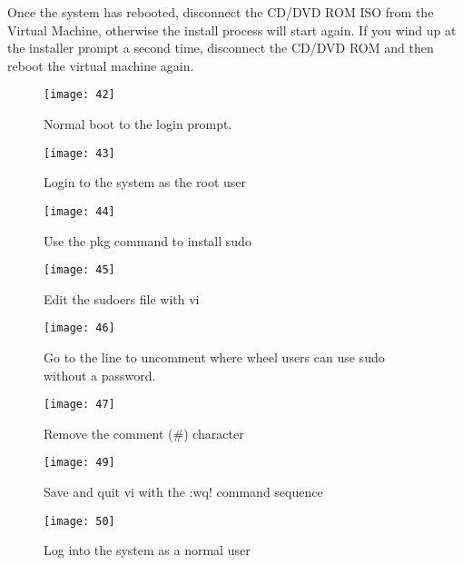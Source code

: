 Once the system has rebooted, disconnect the CD/DVD ROM ISO from the
Virtual Machine, otherwise the install process will start again.  If
you wind up at the installer prompt a second time, disconnect the
CD/DVD ROM and then reboot the virtual machine again.

\begin{figure}
  \centering
\texttt{[image: 42]}
  \caption{Normal boot to the login prompt.}
  \label{fig:utm-fbsd-login}
\end{figure}

\begin{figure}
  \centering
\texttt{[image: 43]}
  \caption{Login to the system as the root user}
  \label{fig:utm-fbsd-root}
\end{figure}

\begin{figure}
  \centering
\texttt{[image: 44]}
  \caption{Use the pkg command to install sudo}
  \label{fig:utm-fbsd-pkg}
\end{figure}

\begin{figure}
  \centering
\texttt{[image: 45]}
  \caption{Edit the sudoers file with vi}
  \label{fig:utm-fbsd-sudoers}
\end{figure}

\begin{figure}
  \centering
\texttt{[image: 46]}
  \caption{Go to the line to uncomment where wheel users can use sudo
    without a password.}
  \label{fig:utm-fbsd-wheel}
\end{figure}

\begin{figure}
  \centering
\texttt{[image: 47]}
  \caption{Remove the comment (\#) character}
  \label{fig:umt-fbsd-uncomment}
\end{figure}

\begin{figure}
  \centering
\texttt{[image: 49]}
  \caption{Save and quit vi with the :wq! command sequence}
  \label{fig:utm-fbsd-wq}
\end{figure}

\begin{figure}
  \centering
\texttt{[image: 50]}
  \caption{Log into the system as a normal user}
  \label{fig:utm-fbsd-alice-login}
\end{figure}

